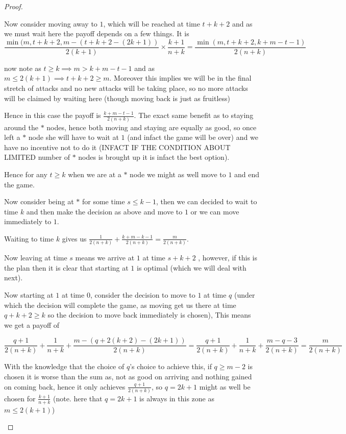 \documentclass[a4paper,10pt]{article}
\theoremstyle{definition}
\theoremstyle{definition}
\theoremstyle{remark}
\theoremstyle{definition}
\begin{document}
\begin{proof}
\begin{itemize}
Now consider moving away to $1$, which will be reached at time $t+k+2$ and as we must wait here the payoff depends on a few things. It is 
$$\frac{\min (m,t+k+2,m-(t+k+2-(2k+1))}{2(k+1)} \times \frac{k+1}{n+k} =
\frac{\min (m,t+k+2,k+m-t-1)}{2(n+k)}$$

now note as $t \geq k \implies m > k+m-t-1$ and as $m \leq 2(k+1) \implies t+k+2 \geq m$. Moreover this implies we will be in the final stretch of attacks and no new attacks will be taking place, so no more attacks will be claimed by waiting here (though moving back is just as fruitless)

Hence in this case the payoff is $\frac{k+m-t-1}{2(n+k)}$. The exact same benefit as to staying around the $*$ nodes, hence both moving and staying are equally as good, so once left a $*$ node she will have to wait at $1$ (and infact the game will be over) and we have no incentive not to do it (INFACT IF THE CONDITION ABOUT LIMITED number of $*$ nodes is brought up it is infact the best option).

Hence for any $t \geq k$ when we are at a $*$ node we might as well move to $1$ and end the game.


Now consider being at $*$ for some time $s \leq k-1$, then we can decided to wait to time $k$ and then make the decision as above and move to $1$ or we can move immediately to $1$.

Waiting to time $k$ gives us $\frac{1}{2(n+k)} + \frac{k+m-k-1}{2(n+k)}=\frac{m}{2(n+k)}$.

Now leaving at time $s$ means we arrive at $1$ at time $s+k+2$ , however, if this is the plan then it is clear that starting at $1$ is optimal (which we will deal with next).

Now starting at $1$ at time $0$, consider the decision to move to $1$ at time $q$ (under which the decision will complete the game, as moving get us there at time $q+k+2 \geq k$ so the decision to move back immediately is chosen), This means we get a payoff of

$$ \frac{q+1}{2(n+k)} +\frac{1}{n+k} + \frac{m-(q+2(k+2)-(2k+1))}{2(n+k)}
=\frac{q+1}{2(n+k)}+\frac{1}{n+k}+\frac{m-q-3}{2(n+k)}=\frac{m}{2(n+k)} $$

With the knowledge that the choice of $q$'s choice to achieve this, if $q \geq m-2$ is chosen it is worse than the sum as, not as good on arriving and nothing gained on coming back, hence it only achieves $\frac{q+1}{2(n+k)}$, so $q=2k+1$ might as well be chosen for $\frac{k+1}{n+k}$ (note. here that $q=2k+1$ is always in this zone as $m \leq 2(k+1)$)


\end{itemize}
\end{proof}
\end{document}
